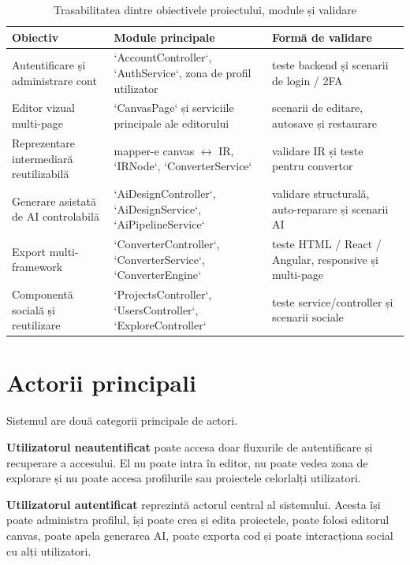 \begin{table}[H]
  \centering
  \caption{Trasabilitatea dintre obiectivele proiectului, module și validare}
  \label{tab:trasabilitate-obiective}
  \renewcommand{\arraystretch}{1.15}
  \begin{tabularx}{\textwidth}{>{\RaggedRight\arraybackslash}p{4.2cm}YY}
    \toprule
    \textbf{Obiectiv} & \textbf{Module principale} & \textbf{Formă de validare} \\
    \midrule
    Autentificare și administrare cont & `AccountController`, `AuthService`, zona de profil utilizator & teste backend și scenarii de login / 2FA \\
    Editor vizual multi-page & `CanvasPage` și serviciile principale ale editorului & scenarii de editare, autosave și restaurare \\
    Reprezentare intermediară reutilizabilă & mapper-e canvas $\leftrightarrow$ IR, `IRNode`, `ConverterService` & validare IR și teste pentru convertor \\
    Generare asistată de AI controlabilă & `AiDesignController`, `AiDesignService`, `AiPipelineService` & validare structurală, auto-reparare și scenarii AI \\
    Export multi-framework & `ConverterController`, `ConverterService`, `ConverterEngine` & teste HTML / React / Angular, responsive și multi-page \\
    Componentă socială și reutilizare & `ProjectsController`, `UsersController`, `ExploreController` & teste service/controller și scenarii sociale \\
    \bottomrule
  \end{tabularx}
\end{table}

\section{Actorii principali}

Sistemul are două categorii principale de actori.

\textbf{Utilizatorul neautentificat} poate accesa doar fluxurile de autentificare și recuperare a accesului. El nu poate intra în editor, nu poate vedea zona de explorare și nu poate accesa profilurile sau proiectele celorlalți utilizatori.

\textbf{Utilizatorul autentificat} reprezintă actorul central al sistemului. Acesta își poate administra profilul, își poate crea și edita proiectele, poate folosi editorul canvas, poate apela generarea AI, poate exporta cod și poate interacționa social cu alți utilizatori.

